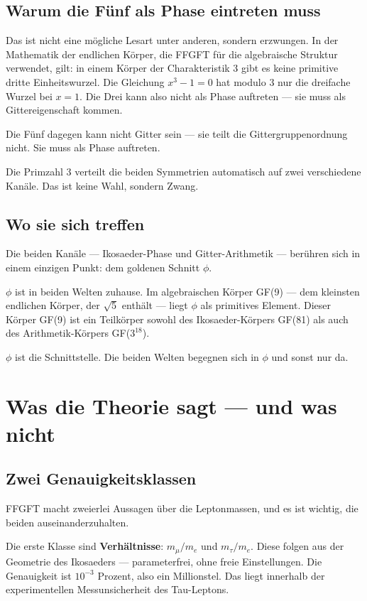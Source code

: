 \documentclass[12pt,oneside]{book}
\begin{document}
\section{Warum die Fünf als Phase eintreten muss}

Das ist nicht eine mögliche Lesart unter anderen, sondern erzwungen. In der Mathematik der endlichen Körper, die FFGFT für die algebraische Struktur verwendet, gilt: in einem Körper der Charakteristik 3 gibt es keine primitive dritte Einheitswurzel. Die Gleichung $x^3 - 1 = 0$ hat modulo 3 nur die dreifache Wurzel bei $x = 1$. Die Drei kann also nicht als Phase auftreten — sie muss als Gittereigenschaft kommen.

Die Fünf dagegen kann nicht Gitter sein — sie teilt die Gittergruppenordnung nicht. Sie muss als Phase auftreten.

Die Primzahl 3 verteilt die beiden Symmetrien automatisch auf zwei verschiedene Kanäle. Das ist keine Wahl, sondern Zwang.

\section{Wo sie sich treffen}

Die beiden Kanäle — Ikosaeder-Phase und Gitter-Arithmetik — berühren sich in einem einzigen Punkt: dem goldenen Schnitt $\phi$.

$\phi$ ist in beiden Welten zuhause. Im algebraischen Körper GF(9) — dem kleinsten endlichen Körper, der $\sqrt{5}$ enthält — liegt $\phi$ als primitives Element. Dieser Körper GF(9) ist ein Teilkörper sowohl des Ikosaeder-Körpers GF(81) als auch des Arithmetik-Körpers GF($3^{18}$).

$\phi$ ist die Schnittstelle. Die beiden Welten begegnen sich in $\phi$ und sonst nur da.

\chapter{Was die Theorie sagt — und was nicht}

\section{Zwei Genauigkeitsklassen}

FFGFT macht zweierlei Aussagen über die Leptonmassen, und es ist wichtig, die beiden auseinanderzuhalten.

Die erste Klasse sind \textbf{Verhältnisse}: $m_\mu/m_e$ und $m_\tau/m_e$. Diese folgen aus der Geometrie des Ikosaeders — parameterfrei, ohne freie Einstellungen. Die Genauigkeit ist $10^{-3}$ Prozent, also ein Millionstel. Das liegt innerhalb der experimentellen Messunsicherheit des Tau-Leptons.
\end{document}
